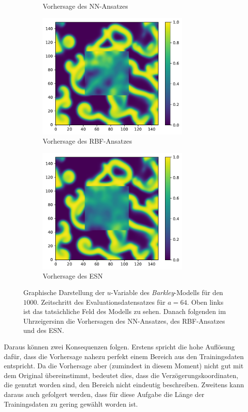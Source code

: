 \begin{figure}[H]
\begin{subfigure}{.5\textwidth}
		\setcapmargin[1cm]{0.5cm}
  		\caption{Vorhersage des \textsc{NN}-Ansatzes}
  		\label{fig:exp_inner_cross_barkley_result_nn_pred}
	\end{subfigure}
	\begin{subfigure}{.5\textwidth}
		\centering
		\includegraphics[height=2.5in]{figures/results/inner_cross_prediction/barkley_u_inner_rbf.pdf}
		\setcapmargin[1cm]{0.5cm}
  		\caption{Vorhersage des \textsc{RBF}-Ansatzes}
  		\label{fig:exp_inner_cross_barkley_result_rbf_pred}
	\end{subfigure}%
	\begin{subfigure}{.5\textwidth}
		\centering
		\includegraphics[height=2.5in]{figures/results/inner_cross_prediction/barkley_u_inner_esn.pdf}
		\setcapmargin[1cm]{0.5cm}
  		\caption{Vorhersage des \textsc{ESN}}
  		\label{fig:exp_inner_cross_barkley_result_esn_pred}
	\end{subfigure}
	\caption{Graphische Darstellung der $u$-Variable des \textit{Barkley}-Modells für den $1000$. Zeitschritt des Evaluationsdatensatzes für $a=64$. Oben links ist das tatsächliche Feld des Modells zu sehen. Danach folgenden im Uhrzeigersinn die Vorhersagen des \textsc{NN}-Ansatzes, des \textsc{RBF}-Ansatzes und des \textsc{ESN}.}
	\label{fig:exp_inner_cross_barkley_result}
\end{figure} 

Daraus können zwei Konsequenzen folgen. Erstens spricht die hohe Auflösung dafür, dass die Vorhersage nahezu perfekt einem Bereich aus den Trainingsdaten entspricht. Da die Vorhersage aber (zumindest in diesem Moment) nicht gut mit dem Original übereinstimmt, bedeutet dies, dass die Verzögerungskoordinaten, die genutzt worden sind, den Bereich nicht eindeutig beschreiben. Zweitens kann daraus auch gefolgert werden, dass für diese Aufgabe die Länge der Trainingsdaten zu gering gewählt worden ist. 
